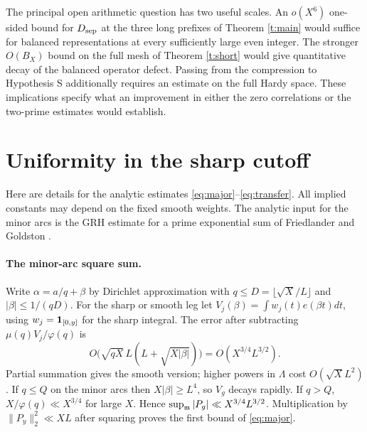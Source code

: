 \documentclass[11pt,a4paper]{article}
\begin{document}
The principal open arithmetic question has two useful scales. An \(o(X^6)\) one-sided bound for \(D_{{\mathrm{sep}}}\) at the three long prefixes of Theorem \ref{t:main} would suffice for balanced representations at every sufficiently large even integer. The stronger \(O(B_X)\) bound on the full mesh of Theorem \ref{t:short} would give quantitative decay of the balanced operator defect. Passing from the compression to Hypothesis S additionally requires an estimate on the full Hardy space. These implications specify what an improvement in either the zero correlations or the two-prime estimates would establish.

\appendix
\section{Uniformity in the sharp cutoff}\label{a:transfer}
Here are details for the analytic estimates \eqref{eq:major}--\eqref{eq:transfer}. All implied constants may depend on the fixed smooth weights. The analytic input for the minor arcs is the GRH estimate for a prime exponential sum of Friedlander and Goldston \cite[eq.~(1.15)]{FG}.
\paragraph{The minor-arc square sum.}
Write \(\alpha=a/q+\beta\) by Dirichlet approximation with \(q\le D=\lfloor\sqrt X/L\rfloor\) and \(|\beta|\le 1/(qD)\). For the sharp or smooth leg let \(V_j(\beta)=\int w_j(t)e(\beta t)dt\), using \(w_j=\mathbf1_{[0,y]}\) for the sharp integral. The error after subtracting \(\mu(q)V_j/\varphi(q)\) is
\[
 O\big(\sqrt{qX}\,L(L+\sqrt{X|\beta|})\big)=O(X^{3/4}L^{3/2}).
\]
Partial summation gives the smooth version; higher powers in \(\Lambda\) cost \(O(\sqrt X L^2)\). If \(q\le Q\) on the minor arcs then \(X|\beta|\ge L^4\), so \(V_g\) decays rapidly. If \(q>Q\), \(X/\varphi(q)\ll X^{3/4}\) for large \(X\). Hence \(\sup_{{\mathfrak m}}|P_g|\ll X^{3/4}L^{3/2}\). Multiplication by \(\|P_y\|_2^2\ll XL\) after squaring proves the first bound of \eqref{eq:major}.
\end{document}
